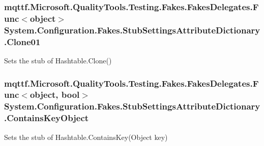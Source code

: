 \hypertarget{class_system_1_1_configuration_1_1_fakes_1_1_stub_settings_attribute_dictionary_a48ea77b8f681f8bcf2304b6ea5297ee5}{
\subsubsection[{Clone01}]{\setlength{\rightskip}{0pt plus 5cm}mqttf.\-Microsoft.\-Quality\-Tools.\-Testing.\-Fakes.\-Fakes\-Delegates.\-Func$<$object$>$ System.\-Configuration.\-Fakes.\-Stub\-Settings\-Attribute\-Dictionary.\-Clone01}}\label{class_system_1_1_configuration_1_1_fakes_1_1_stub_settings_attribute_dictionary_a48ea77b8f681f8bcf2304b6ea5297ee5}


Sets the stub of Hashtable.\-Clone()

\hypertarget{class_system_1_1_configuration_1_1_fakes_1_1_stub_settings_attribute_dictionary_a3d68f2e965f5a2b1c31e85da9f04e357}{
\subsubsection[{Contains\-Key\-Object}]{\setlength{\rightskip}{0pt plus 5cm}mqttf.\-Microsoft.\-Quality\-Tools.\-Testing.\-Fakes.\-Fakes\-Delegates.\-Func$<$object, bool$>$ System.\-Configuration.\-Fakes.\-Stub\-Settings\-Attribute\-Dictionary.\-Contains\-Key\-Object}}\label{class_system_1_1_configuration_1_1_fakes_1_1_stub_settings_attribute_dictionary_a3d68f2e965f5a2b1c31e85da9f04e357}


Sets the stub of Hashtable.\-Contains\-Key(\-Object key)

